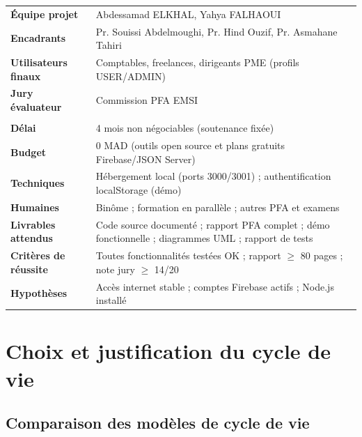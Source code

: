 \documentclass[12pt,a4paper]{report}
\begin{document}
\begin{table}[H]
\begin{tabularx}{\textwidth}{|l|X|}
\hline
\rowcolor{lightblue}\multicolumn{2}{|l|}{\textbf{Parties prenantes}} \\
\hline
\textbf{Équipe projet} & Abdessamad ELKHAL, Yahya FALHAOUI \\
\textbf{Encadrants} & Pr. Souissi Abdelmoughi, Pr. Hind Ouzif, Pr. Asmahane Tahiri \\
\textbf{Utilisateurs finaux} & Comptables, freelances, dirigeants PME (profils USER/ADMIN) \\
\textbf{Jury évaluateur} & Commission PFA EMSI \\
\hline
\rowcolor{lightblue}\multicolumn{2}{|l|}{\textbf{Contraintes}} \\
\hline
\textbf{Délai} & 4 mois non négociables (soutenance fixée) \\
\textbf{Budget} & 0 MAD (outils open source et plans gratuits Firebase/JSON Server) \\
\textbf{Techniques} & Hébergement local (ports 3000/3001) ; authentification localStorage (démo) \\
\textbf{Humaines} & Binôme ; formation en parallèle ; autres PFA et examens \\
\hline
\textbf{Livrables attendus} & Code source documenté ; rapport PFA complet ; démo fonctionnelle ; diagrammes UML ; rapport de tests \\
\textbf{Critères de réussite} & Toutes fonctionnalités testées OK ; rapport $\geq$ 80 pages ; note jury $\geq$ 14/20 \\
\textbf{Hypothèses} & Accès internet stable ; comptes Firebase actifs ; Node.js installé \\
\hline
\end{tabularx}
\end{table}

\section{Choix et justification du cycle de vie}

\subsection{Comparaison des modèles de cycle de vie}
\end{document}
